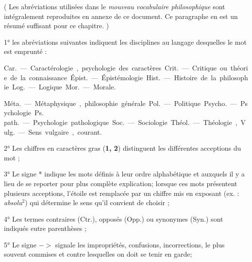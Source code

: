 
(  Les abréviations utilisées dans le {\it mouveau vocabulaire philosophique} sont intégralement reproduites en annexe de ce document. Ce paragraphe en est un résumé suffisant pour ce chapitre. )

\vspace{0.211cm}
1° les abréviations suivantes indiquent les
disciplines au langage desquelles le mot est emprunté :

\vspace{0.211cm}
\hfill
\begin{minipage}[c]{.45\linewidth}
\si{Car.} — Caractérologie, psychologie
des caractères.

\si{Crit.} — Critique ou théorie de la
connaissance.

\si{Épist.} — Épistémologie.

\si{Hist.} — Histoire de la philosophie.

\si{Log.} — Logique.

\si{Mor.} — Morale.
\end{minipage}
\hfill
\begin{minipage}[c]{.45\linewidth}
\si{Méta.} — Métaphysique, philosophie
générale.

\si{Pol.}. — Politique.

\si{Psycho.} — Psychologie.

\si{Ps. path.} — Psychologie pathologique.

\si{Soc.} — Sociologie.

\si{Théol.} — Théologie,

\si{Vulg.} — Sens vulgaire, courant.
\end{minipage}

\vspace{0.211cm}
2° Les chiffres en caractères gras ({\bf 1, 2}) distinguent les différentes acceptions
du mot ;

3° Le signe * indique les mots définis à leur ordre alphabétique et auxquels
il y a lieu de se reporter pour plus complète explication; lorsque ces mots présentent plusieurs acceptions, l'étoile est remplacée par un chiffre mis en exposant (ex. : {\it absolu}$^2$) qui détermine le sens qu'il convient de choisir ;

4° Les termes contraires (Ctr.), opposés (Opp.) ou synonymes (Syn.) sont
indiqués eutre parenthèses ;

5° Le signe $->$
signale les impropriétés, confusions, incorrections, le plus
souvent commises et contre lesquelles on doit se tenir en garde;

